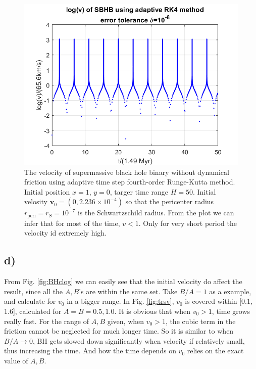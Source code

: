 \documentclass[12pt, graphicx]{article}
\begin{document}
\begin{figure}[ht]
\centering
\includegraphics[width = 120mm]{BH_a8logv.png}
\caption{The velocity of supermassive black hole binary without dynamical friction using adaptive time step fourth-order Runge-Kutta method. Initial position $x=1$, $y=0$, targer time range $H=50$. Initial velosity $\mathbf{v}_0=(0,2.236\times10^{-4})$ so that the pericenter radius $r_\mathrm{peri}=r_S=10^{-7}$ is the Schwartzschild radius. From the plot we can infer that for most of the time, $v<1$. Only for very short period the velocity id extremely high.}
\label{fig:BHalogv}
\end{figure}

\subsection*{d)}
From Fig. \ref{fig:BHclog} we can easily see that the initial velocity do affect the result, since all the $A, B$'s are within the same set. Take $B/A=1$ as a example, and calculate for $v_0$ in a bigger range. In Fig. \ref{fig:trsv}, $v_0$ is covered within [0.1, 1.6], calculated for $A=B=0.5, 1.0$. It is obvious that when $v_0>1$, time grows really fast. For the range of $A, B$ given, when $v_0>1$, the cubic term in the friction cannot be neglected for much longer time. So it is similar to when $B/A\to 0$, BH gets slowed down significantly when velocity if relatively small, thus increasing the time. And how the time depends on $v_0$ relies on the exact value of $A, B$. \par
\end{document}
